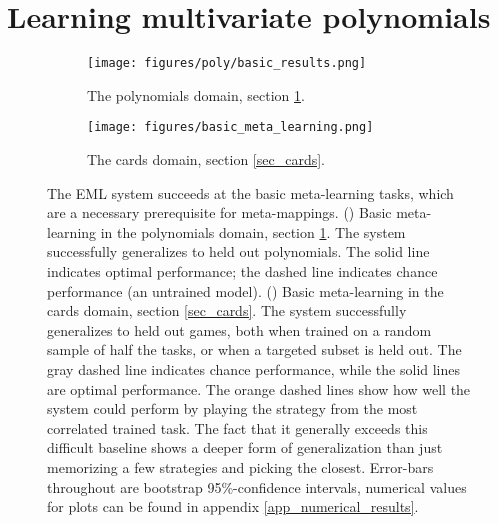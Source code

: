 \documentclass{article}
\begin{document}
\section{Learning multivariate polynomials} \label{sec_poly}
\vspace{-0.5em} %
\begin{figure}
\centering
\begin{subfigure}[t]{0.5\textwidth}
\texttt{[image: figures/poly/basic\_results.png]}
\caption{The polynomials domain, section \ref{sec_poly}.}
\label{poly_basic_results}
\end{subfigure}%
\begin{subfigure}[t]{0.5\textwidth}
\texttt{[image: figures/basic\_meta\_learning.png]}
\caption{The cards domain, section \ref{sec_cards}.}
\label{cards_basic_results}
\end{subfigure}%
\caption{The EML system succeeds at the basic meta-learning tasks, which are a necessary prerequisite for meta-mappings. () Basic meta-learning in the polynomials domain, section \ref{sec_poly}. The system successfully generalizes to held out polynomials. The solid line indicates optimal performance; the dashed line indicates chance performance (an untrained model). () Basic meta-learning in the cards domain, section \ref{sec_cards}. The system successfully generalizes to held out games, both when trained on a random sample of half the tasks, or when a targeted subset is held out. The gray dashed line indicates chance performance, while the solid lines are optimal performance. The orange dashed lines show how well the system could perform by playing the strategy from the most correlated trained task. The fact that it generally exceeds this difficult baseline shows a deeper form of generalization than just memorizing a few strategies and picking the closest. Error-bars throughout are bootstrap 95\%-confidence intervals, numerical values for plots can be found in appendix \ref{app_numerical_results}.}
\end{figure}
\end{document}
